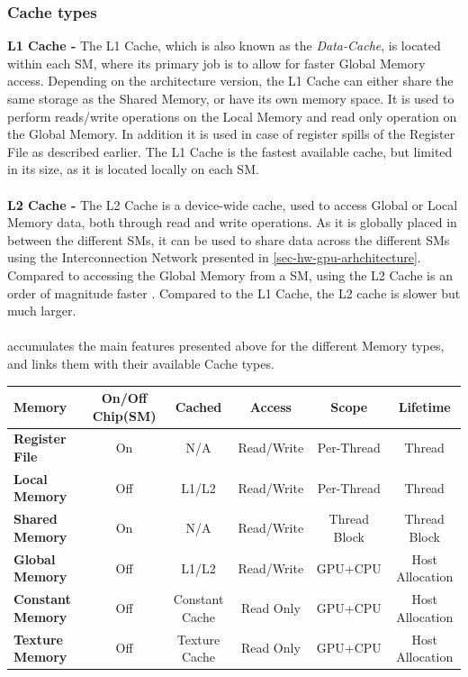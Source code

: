 \subsubsection{Cache types}
\label{sec-cac-types}
\textbf{L1 Cache -} The L1 Cache, which is also known as the \textit{Data-Cache}, is located within each SM, where its primary job is to allow for faster Global Memory access.
Depending on the architecture version, the L1 Cache can either share the same storage as the Shared Memory, or have its own memory space.
It is used to perform reads/write operations on the Local Memory and read only operation on the Global Memory.
In addition it is used in case of register spills of the Register File as described earlier.
The L1 Cache is the fastest available cache, but limited in its size, as it is located locally on each SM.
\\\\
\textbf{L2 Cache -} The L2 Cache is a device-wide cache, used to access Global or Local Memory data, both through read and write operations.
As it is globally placed in between the different SMs, it can be used to share data across the different SMs using the Interconnection Network presented in \cref{sec-hw-gpu-arhchitecture}.
Compared to accessing the Global Memory from a SM, using the L2 Cache is an order of magnitude faster \cite{Cook2008}.
Compared to the L1 Cache, the L2 cache is slower but much larger.
\\\\
 accumulates the main features presented above for the different Memory types, and links them with their available Cache types.

\begin{table}[]
	\begin{tabular}{|l|c|c|c|c|c|}
		\hline
		\textbf{Memory}          & \textbf{On/Off Chip(SM)} & \textbf{Cached} & \textbf{Access} & \textbf{Scope} & \textbf{Lifetime} \\ \hline
		\textbf{Register File}  & On                   & N/A             & Read/Write      & Per-Thread     & Thread            \\ \hline
		\textbf{Local Memory}    & Off                  & L1/L2           & Read/Write      & Per-Thread     & Thread            \\ \hline
		\textbf{Shared Memory}   & On                   & N/A             & Read/Write      & Thread Block   & Thread Block      \\ \hline
		\textbf{Global Memory}   & Off                  & L1/L2           & Read/Write      & GPU+CPU        & Host Allocation   \\ \hline
		\textbf{Constant Memory} & Off                  & Constant Cache  & Read Only       & GPU+CPU        & Host Allocation   \\ \hline
		\textbf{Texture Memory}  & Off                  & Texture Cache   & Read Only       & GPU+CPU        & Host Allocation   \\ \hline
	\end{tabular}
	\centering
	\label{alg-gpu-mem}
\end{table}

